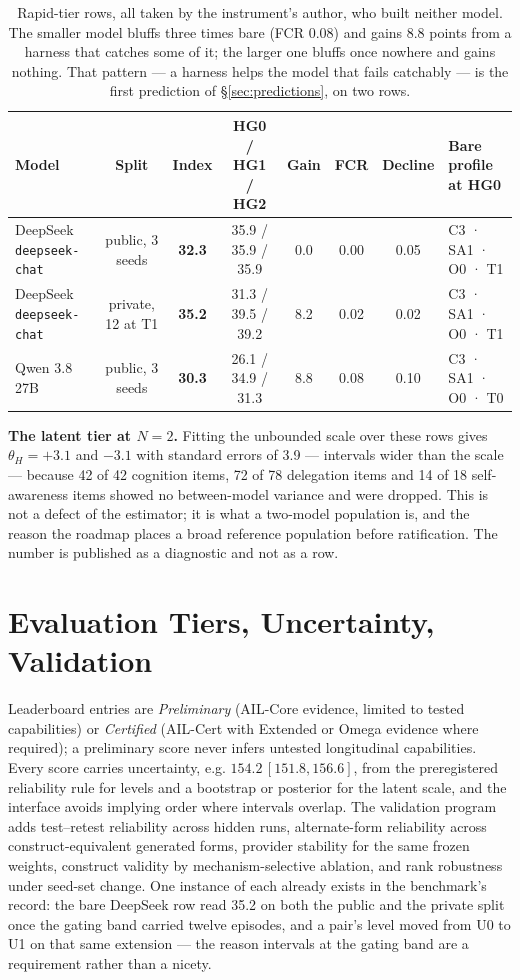 \documentclass[11pt]{article}
\theoremstyle{definition}
\begin{document}
\begin{table}[!htbp]
\centering\small
\begin{tabularx}{\textwidth}{@{}lccccccY@{}}
\toprule
Model & Split & \textbf{Index} & HG0 / HG1 / HG2 & Gain & FCR & Decline & Bare profile at HG0 \\
\midrule
DeepSeek \texttt{deepseek-chat} & public, 3 seeds & \textbf{32.3} & 35.9 / 35.9 / 35.9 & 0.0 & 0.00 & 0.05 & C3 · SA1 · O0 · T1 \\
DeepSeek \texttt{deepseek-chat} & private, 12 at T1 & \textbf{35.2} & 31.3 / 39.5 / 39.2 & 8.2 & 0.02 & 0.02 & C3 · SA1 · O0 · T1 \\
Qwen 3.8 27B & public, 3 seeds & \textbf{30.3} & 26.1 / 34.9 / 31.3 & 8.8 & 0.08 & 0.10 & C3 · SA1 · O0 · T0 \\
\bottomrule
\end{tabularx}
\caption{Rapid-tier rows, all taken by the instrument's author, who built neither model. The smaller model bluffs three times bare (FCR 0.08) and gains 8.8 points from a harness that catches some of it; the larger one bluffs once nowhere and gains nothing. That pattern --- a harness helps the model that fails catchably --- is the first prediction of \S\ref{sec:predictions}, on two rows.}
\label{tab:rapid}
\end{table}

\textbf{The latent tier at $N = 2$.} Fitting the unbounded scale over these rows gives $\theta_H = +3.1$ and $-3.1$ with standard errors of 3.9 --- intervals wider than the scale --- because 42 of 42 cognition items, 72 of 78 delegation items and 14 of 18 self-awareness items showed no between-model variance and were dropped. This is not a defect of the estimator; it is what a two-model population is, and the reason the roadmap places a broad reference population before ratification. The number is published as a diagnostic and not as a row.

\section{Evaluation Tiers, Uncertainty, Validation}\label{sec:validation}

Leaderboard entries are \emph{Preliminary} (AIL-Core evidence, limited to tested capabilities) or \emph{Certified} (AIL-Cert with Extended or Omega evidence where required); a preliminary score never infers untested longitudinal capabilities. Every score carries uncertainty, e.g. $154.2\,[151.8, 156.6]$, from the preregistered reliability rule for levels and a bootstrap or posterior for the latent scale, and the interface avoids implying order where intervals overlap. The validation program adds test--retest reliability across hidden runs, alternate-form reliability across construct-equivalent generated forms, provider stability for the same frozen weights, construct validity by mechanism-selective ablation, and rank robustness under seed-set change. One instance of each already exists in the benchmark's record: the bare DeepSeek row read 35.2 on both the public and the private split once the gating band carried twelve episodes, and a pair's level moved from U0 to U1 on that same extension --- the reason intervals at the gating band are a requirement rather than a nicety.
\end{document}
